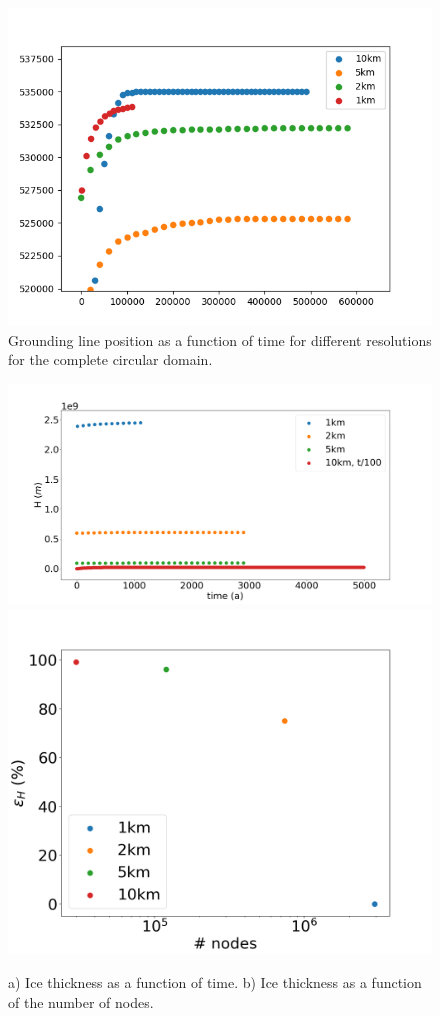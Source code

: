 \documentclass{article}
\begin{document}
	\begin{figure}[!h]
	\centering
	\includegraphics[width=0.9\linewidth]{../fig/Grounding_line_integrated_full_domain_CONE_time.png}
	\caption{Grounding line position as a function of time for different resolutions for the complete circular domain.}
	\label{TimeVsGroundingLinePosition_full}
	\end{figure}


	\begin{figure}[!h]
	\centering
	\includegraphics[width=0.45\linewidth]{../fig/H_CONE_full_all_res_vs_time.png}
	\includegraphics[width=0.45\linewidth]{../fig/H_CONE_full_all_res_vs_num_nodes.png}
	\caption{a) Ice thickness as a function of time. b) Ice thickness as a function of the number of nodes.}
	\label{H_CONE_all_res}
	\end{figure}
\end{document}
